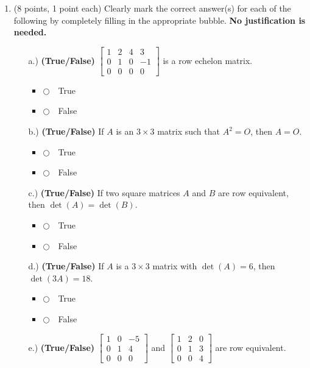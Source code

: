 \documentclass[12pt]{extarticle}
\newcommand{\chooseone}{{\Large$\Circle$\ \ }}
\begin{document}
\begin{enumerate}

  \item (8 points, 1 point each)  Clearly mark the correct answer(s) for each of the following by completely filling in the appropriate bubble.  \textbf{No justification is needed.}
\begin{itemize}
\item[a.)] \textbf{(True/False)} $\left[\begin{array}{cccc}
1 & 2 & 4 & 3 
\\
 0 & 1 & 0 & -1 
\\
 0 & 0 & 0 & 0 
\end{array}\right]$ is a row echelon matrix. %
\begin{itemize}[label={}]
\item \chooseone True
\item \chooseone False
\end{itemize}

\vspace{2cm}
\item[b.)]  \textbf{(True/False)} If $A$ is an $3\times 3$ matrix such that $A^2=O$, then $A=O$. %
\begin{itemize}[label={}] 
\item \chooseone True
\item \chooseone False
\end{itemize}
\vspace{2cm}

\item[c.)]  \textbf{(True/False)} If two square matrices $A$ and $B$ are row equivalent, then $\det(A) = \det(B)$. %
\begin{itemize}[label={}] 
\item \chooseone True
\item \chooseone False
\end{itemize}
\vspace{2cm}

\item[d.) ]  \textbf{(True/False)} If $A$ is a $3\times 3$ matrix with $\det(A)=6$, then $\det(3A)=18$.
\begin{itemize}[label={}] 
\item \chooseone True
\item \chooseone False
\end{itemize}
\vspace{2cm}

\item[e.) ]  \textbf{(True/False)} $\left[\begin{array}{ccc}
1 & 0 & -5 
\\
 0 & 1 & 4 
\\
 0 & 0 & 0 
\end{array}\right]$  and $ \left[\begin{array}{ccc}
1 & 2 & 0 
\\
 0 & 1 & 3 
\\
 0 & 0 & 4 
\end{array}\right]$ are row equivalent. %


\end{itemize}
\end{enumerate}
\end{document}
